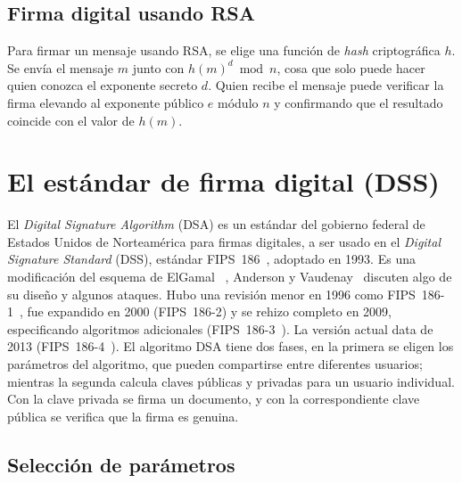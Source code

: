 \subsection{Firma digital usando RSA}
\label{sec:firma-digital-RSA}

  Para firmar un mensaje usando RSA,
  se elige
  una función
    de \emph{\foreignlanguage{english}{hash}} criptográfica \(h\).
  Se envía el mensaje \(m\) junto con \(h(m)^d \bmod n\),
  cosa que solo puede hacer
  quien conozca el exponente secreto \(d\).
  Quien recibe el mensaje puede verificar la firma
  elevando al exponente público \(e\) módulo \(n\)
  y confirmando que el resultado coincide con el valor de \(h(m)\).

\section{El estándar de firma digital (DSS)}
\label{sec:DSS}

  El \emph{\foreignlanguage{english}{Digital Signature Algorithm}}
  (DSA)
  es un estándar del gobierno federal
  de Estados Unidos de Norteamérica
  para firmas digitales,
  a ser usado en el
  \emph{\foreignlanguage{english}{Digital Signature Standard}}
  (DSS),
  estándar FIPS~186~\cite{FIPS-186},
  adoptado en 1993.
  Es una modificación del esquema de ElGamal~%
    \cite{elgamal85:_public_key_crypt_signat_schem},
  Anderson y Vaudenay~\cite{anderson96:_minding_your_p_and_q}
  discuten algo de su diseño y algunos ataques.
  Hubo una revisión menor en 1996 como FIPS~186-1~\cite{FIPS-186-1},
  fue expandido en 2000
  (FIPS~186-2)
  y se rehizo completo en 2009,
  especificando algoritmos adicionales
  (FIPS~186-3~\cite{FIPS-186-3}).
  La versión actual data de 2013
  (FIPS~186-4~\cite{FIPS-186-4}).
  El algoritmo DSA tiene dos fases,
  en la primera se eligen los parámetros del algoritmo,
  que pueden compartirse entre diferentes usuarios;
  mientras la segunda calcula claves públicas y privadas
  para un usuario individual.
  Con la clave privada se firma un documento,
  y con la correspondiente clave pública
  se verifica que la firma es genuina.

\subsection{Selección de parámetros}
\label{sec:DSA-parametros}

